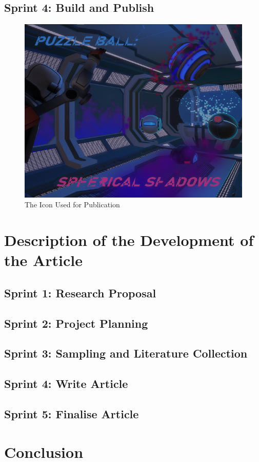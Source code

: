 \subsection{Sprint 4: Build and Publish}



\begin{figure}[H]
\centering
\includegraphics[scale=0.6]{Figures/thumb.png}
\caption{The Icon Used for Publication}
\end{figure}

\section{Description of the Development of the Article}

\subsection{Sprint 1: Research Proposal}

\subsection{Sprint 2: Project Planning}

\subsection{Sprint 3: Sampling and Literature Collection}

\subsection{Sprint 4: Write Article}

\subsection{Sprint 5: Finalise Article}




\section{Conclusion}